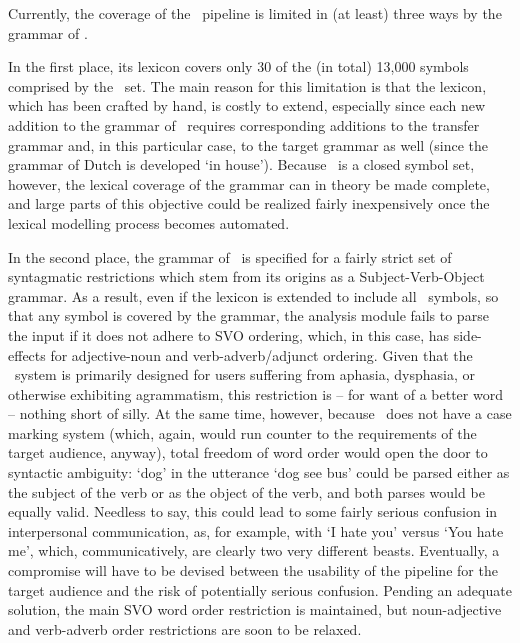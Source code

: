 Currently, the coverage of the
\depicto\ pipeline is limited in (at least) three ways by the grammar of
\sclera.

In the first  place, its lexicon covers only 30 of the (in total) 13,000
symbols comprised by the \sclera\ set. The main reason for this limitation is
that the lexicon, which has been crafted by hand, is costly to extend,
especially since each new addition to the grammar of \sclera\ requires
corresponding additions to the transfer grammar and, in this particular case,
to the target grammar as well (since the grammar of Dutch is developed `in
house'). Because \sclera\ is a closed symbol set, however, the lexical coverage
of the grammar can in theory be made complete, and large parts of this
objective could be realized fairly inexpensively once the lexical modelling
process becomes automated.

In the second place, the grammar of \sclera\ is specified for a fairly strict
set of syntagmatic restrictions which stem from its origins as a
Subject-Verb-Object grammar. As a result, even if the lexicon is extended to
include all \sclera\ symbols, so that any symbol is covered by the grammar, the
analysis module fails to parse the input if it does not adhere to SVO ordering,
which, in this case, has side-effects for adjective-noun and
verb-adverb/adjunct ordering. Given that the \depicto\ system is primarily
designed for users suffering from aphasia, dysphasia, or otherwise exhibiting
agrammatism, this restriction is -- for want of a better word -- nothing short
of silly. At the same time, however, because \sclera\ does not have a case
marking system (which, again, would run counter to the requirements of the
target audience, anyway), total freedom of word order would open the door to
syntactic ambiguity: `dog' in the utterance `dog see bus' could be parsed
either as the subject of the verb or as the object of the verb, and both parses
would be equally valid. Needless to say, this could lead to some fairly serious
confusion in interpersonal communication, as, for example, with `I hate you'
versus `You hate me', which, communicatively, are clearly two very different
beasts. Eventually, a compromise will have to be devised between the usability
of the pipeline for the target audience and the risk of potentially serious
confusion. Pending an adequate solution, the main SVO word order restriction is
maintained, but noun-adjective and verb-adverb order restrictions are soon to
be relaxed.

